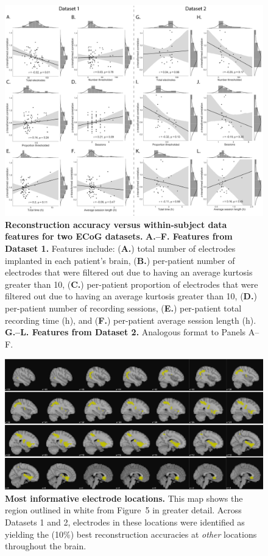 \documentclass[10pt]{article}
\begin{document}
\begin{figure}[p]
\centering
\includegraphics[width=\textwidth]{figs/supplemental_4}
\caption{\textbf{Reconstruction accuracy versus within-subject data
    features for two ECoG datasets.} \textbf{A.--F.  Features from
    Dataset 1.}  Features include: (\textbf{A.}) total number of
  electrodes implanted in each patient's brain, (\textbf{B.})
  per-patient number of electrodes that were filtered out due to
  having an average kurtosis greater than 10, (\textbf{C.})
  per-patient proportion of electrodes that were filtered out due to
  having an average kurtosis greater than 10, (\textbf{D.})
  per-patient number of recording sessions, (\textbf{E.}) per-patient
  total recording time (h), and (\textbf{F.}) per-patient average
  session length (h).  \textbf{G.--L. Features from Dataset 2.}
  Analogous format to Panels A--F.}
\label{fig:supplemental_4}
\end{figure}


\begin{figure}[ptb]
\centering
\includegraphics[width=\textwidth]{figs/supplemental_5}
\caption{\textbf{Most informative electrode locations.}  This map
  shows the region outlined in white from Figure~5 in greater detail.
Across Datasets 1 and 2, electrodes in these locations were identified as yielding the (10\%)
best reconstruction accuracies at \textit{other} locations throughout
the brain.}
\label{fig:supplemental_5}
\end{figure}


% 
\end{document}
